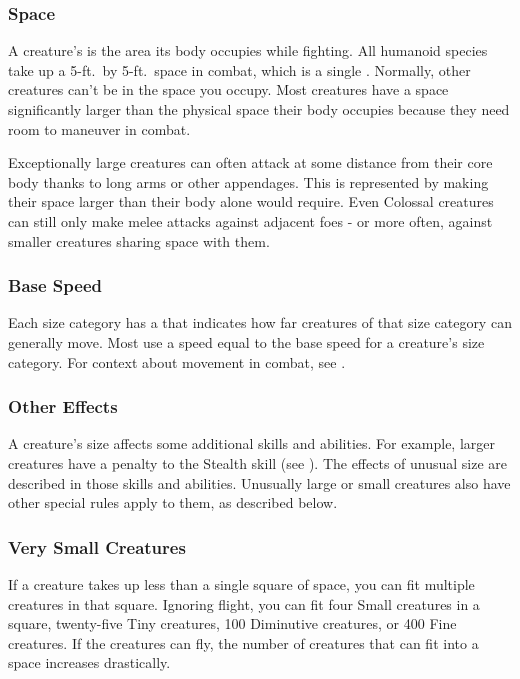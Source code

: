        \subsubsection{Space}\label{Space}
            A creature's  is the area its body occupies while fighting.
            All humanoid species take up a 5-ft.\ by 5-ft.\ space in combat, which is a single .
            Normally, other creatures can't be in the space you occupy.
            Most creatures have a space significantly larger than the physical space their body occupies because they need room to maneuver in combat.

            Exceptionally large creatures can often attack at some distance from their core body thanks to long arms or other appendages.
            This is represented by making their space larger than their body alone would require.
            Even Colossal creatures can still only make melee attacks against adjacent foes - or more often, against smaller creatures sharing space with them.

        \subsubsection{Base Speed}\label{Base Speed}
            Each size category has a  that indicates how far creatures of that size category can generally move.
            Most  use a speed equal to the base speed for a creature's size category.
            For context about movement in combat, see .

        \subsubsection{Other Effects}
            A creature's size affects some additional skills and abilities.
            For example, larger creatures have a penalty to the Stealth skill (see ).
            The effects of unusual size are described in those skills and abilities.
            Unusually large or small creatures also have other special rules apply to them, as described below.

        \subsubsection{Very Small Creatures}
             If a creature takes up less than a single square of space, you can fit multiple creatures in that square.
            Ignoring flight, you can fit four Small creatures in a square, twenty-five Tiny creatures, 100 Diminutive creatures, or 400 Fine creatures.
            If the creatures can fly, the number of creatures that can fit into a space increases drastically.

